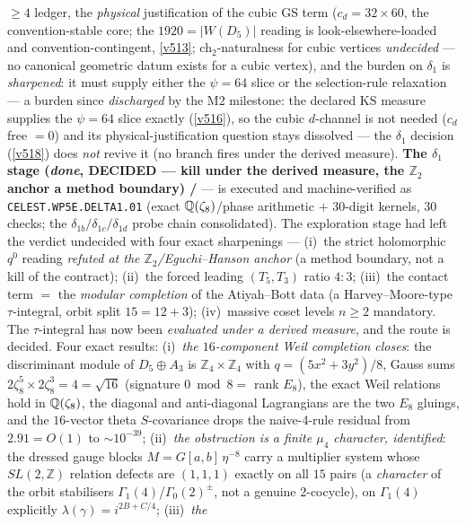\documentclass[11pt,a4paper]{article}
\newcommand{\Z}{\mathbb Z}
\begin{document}
\begin{itemize}
\begin{itemize}
$\ge4$ ledger, the \emph{physical} justification of the cubic GS term ($c_d=32\times60$, the
convention-stable core; the $1920=|W(D_5)|$ reading is look-elsewhere-loaded and
convention-contingent, \vref{v513}; ch$_2$-naturalness for cubic vertices \emph{undecided} --- no
canonical geometric datum exists for a cubic vertex), and the burden on $\delta_1$ is
\emph{sharpened}: it must supply either the $\psi=64$ slice or the selection-rule relaxation ---
a burden since \emph{discharged} by the M2 milestone: the declared KS measure supplies the
$\psi=64$ slice exactly (\vref{v516}), so the cubic $d$-channel is not needed ($c_d$ free $=0$)
and its physical-justification question stays dissolved --- the $\delta_1$ decision
(\vref{v518}) does \emph{not} revive it (no branch fires under the derived measure).
\textbf{The $\delta_1$ stage (\emph{done}, DECIDED --- kill under the derived measure, the
$\Z_2$ anchor a method boundary) \mE/\mC} --- is executed and machine-verified as
\texttt{CELEST.WP5E.DELTA1.01}
 (exact $\mathbb{Q}(\zeta_8)$/phase arithmetic
$+$ 30-digit kernels, $30$ checks; the $\delta_{1b}/\delta_{1c}/\delta_{1d}$ probe chain
consolidated). The exploration stage had left the verdict undecided with four exact
sharpenings ---
(i)~the strict holomorphic $q^0$ reading \emph{refuted at the $\Z_2$/Eguchi--Hanson anchor}
(a method boundary, not a kill of the contract); (ii)~the forced leading $(T_5,T_3)$ ratio
$4{:}3$; (iii)~the contact term $=$ the \emph{modular completion} of the Atiyah--Bott data
(a Harvey--Moore-type $\tau$-integral, orbit split $15=12+3$); (iv)~massive coset levels
$n\ge2$ mandatory. The $\tau$-integral has now been \emph{evaluated under a derived measure},
and the route is decided. Four exact results: (i)~\emph{the $16$-component Weil completion
closes}: the discriminant module of $D_5\oplus A_3$ is $\Z_4{\times}\Z_4$ with
$q=(5x^2{+}3y^2)/8$, Gauss sums $2\zeta_8^5\times2\zeta_8^3=4=\sqrt{16}$ (signature $0\bmod8=$
rank $E_8$), the exact Weil relations hold in $\mathbb{Q}(\zeta_8)$, the diagonal and anti-diagonal
Lagrangians are the two $E_8$ gluings, and the $16$-vector theta $S$-covariance drops the
naive-4-rule residual from $2.91=O(1)$ to $\sim10^{-39}$; (ii)~\emph{the obstruction is a
finite $\mu_4$ character, identified}: the dressed gauge blocks $M=G[a,b]\,\eta^{-8}$ carry a
multiplier system whose $SL(2,\Z)$ relation defects are $(1,1,1)$ exactly on all $15$ pairs
(a \emph{character} of the orbit stabilisers $\Gamma_1(4)$/$\Gamma_0(2)^\pm$, not a genuine
2-cocycle), on $\Gamma_1(4)$ explicitly $\lambda(\gamma)=i^{2B+C/4}$; (iii)~\emph{the
}
\end{itemize}
\end{itemize}
\end{document}
